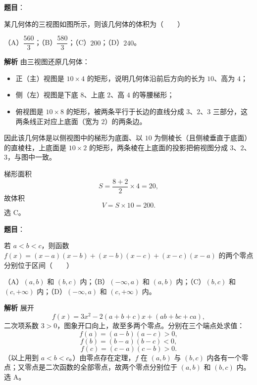 \begin{answer}

\textbf{题目}：

某几何体的三视图如图所示，则该几何体的体积为\mbox{（　　）}
\nopagebreak[4]
\begin{center}\end{center}
\nopagebreak[4]
（A）$\dfrac{560}3$；（B）$\dfrac{580}3$；（C）$200$；（D）$240$。

\textbf{解析}
由三视图还原几何体：

\begin{itemize}
\item 正（主）视图是 $10\times4$ 的矩形，说明几何体沿前后方向的长为 $10$、高为 $4$；
\item 侧（左）视图是下底 $8$、上底 $2$、高 $4$ 的等腰梯形；
\item 俯视图是 $10\times8$ 的矩形，被两条平行于长边的直线分成 $3$、$2$、$3$ 三部分，这两条线正对应上底面（宽为 $2$）的两条边。
\end{itemize}

因此该几何体是以侧视图中的梯形为底面、以 $10$ 为侧棱长（且侧棱垂直于底面）的直棱柱，上底面是 $10\times2$ 的矩形，两条棱在上底面的投影把俯视图分成 $3$、$2$、$3$，与图中一致。

梯形面积
\nopagebreak[4]
\[S=\frac{8+2}2\times4=20,\]
故体积
\nopagebreak[4]
\[V=S\times10=200.\]
选 C。


\end{answer}
\begin{answer}

\textbf{题目}：

若 $a<b<c$，则函数 $f(x)=(x-a)(x-b)+(x-b)(x-c)+(x-c)(x-a)$ 的两个零点分别位于区间\mbox{（　　）}

（A）$(a,b)$ 和 $(b,c)$ 内；（B）$(-\infty,a)$ 和 $(a,b)$ 内；（C）$(b,c)$ 和 $(c,+\infty)$ 内；（D）$(-\infty,a)$ 和 $(c,+\infty)$ 内。

\textbf{解析}
展开
\nopagebreak[4]
\[f(x)=3x^2-2(a+b+c)x+(ab+bc+ca),\]
二次项系数 $3>0$，图象开口向上，故至多两个零点。分别在三个端点处求值：
\nopagebreak[4]
\[f(a)=(a-b)(a-c)>0,\]
\nopagebreak[4]
\[f(b)=(b-a)(b-c)<0,\]
\nopagebreak[4]
\[f(c)=(c-a)(c-b)>0.\]
（以上用到 $a<b<c$。）由零点存在定理，$f$ 在 $(a,b)$ 与 $(b,c)$ 内各有一个零点；又零点是二次函数的全部零点，故两个零点分别位于 $(a,b)$ 和 $(b,c)$ 内。选 A。


\end{answer}
